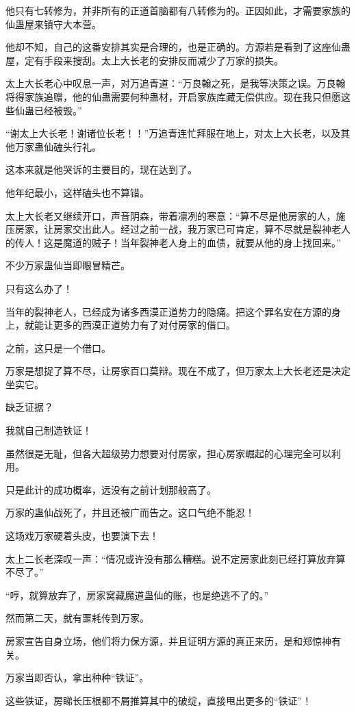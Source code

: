 \begin{this_body}
他只有七转修为，并非所有的正道首脑都有八转修为的。正因如此，才需要家族的仙蛊屋来镇守大本营。

他却不知，自己的这番安排其实是合理的，也是正确的。方源若是看到了这座仙蛊屋，定有手段来搜刮。太上大长老的安排反而减少了万家的损失。

太上大长老心中叹息一声，对万追青道：“万良翰之死，是我等决策之误。万良翰将得家族追赠，他的仙蛊需要何种蛊材，开启家族库藏无偿供应。现在我只但愿这些仙蛊已经被毁。”

“谢太上大长老！谢诸位长老！！”万追青连忙拜服在地上，对太上大长老，以及其他万家蛊仙磕头行礼。

这本来就是他哭诉的主要目的，现在达到了。

他年纪最小，这样磕头也不算错。

太上大长老又继续开口，声音阴森，带着凛冽的寒意：“算不尽是他房家的人，施压房家，让房家交出此人。经过之前一战，我万家已可肯定，算不尽就是裂神老人的传人！这是魔道的贼子！当年裂神老人身上的血债，就要从他的身上找回来。”

不少万家蛊仙当即眼冒精芒。

只有这么办了！

当年的裂神老人，已经成为诸多西漠正道势力的隐痛。把这个罪名安在方源的身上，就能让更多的西漠正道势力有了对付房家的借口。

之前，这只是一个借口。

万家是想捉了算不尽，让房家百口莫辩。现在不成了，但万家太上大长老还是决定坐实它。

缺乏证据？

我就自己制造铁证！

虽然很是无耻，但各大超级势力想要对付房家，担心房家崛起的心理完全可以利用。

只是此计的成功概率，远没有之前计划那般高了。

万家的蛊仙战死了，并且还被广而告之。这口气绝不能忍！

这场戏万家硬着头皮，也要演下去！

太上二长老深叹一声：“情况或许没有那么糟糕。说不定房家此刻已经打算放弃算不尽了。”

“哼，就算放弃了，房家窝藏魔道蛊仙的账，也是绝逃不了的。”

然而第二天，就有噩耗传到万家。

房家宣告自身立场，他们将力保方源，并且证明方源的真正来历，是和郑惊神有关。

万家当即否认，拿出种种“铁证”。

这些铁证，房睇长压根都不屑推算其中的破绽，直接甩出更多的“铁证”！


\end{this_body}
